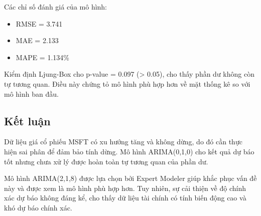 Các chỉ số đánh giá của mô hình:

\begin{itemize}
    \item RMSE = 3.741
    \item MAE = 2.133
    \item MAPE = 1.134\%
\end{itemize}

Kiểm định Ljung-Box cho p-value = 0.097 (> 0.05), cho thấy phần dư không còn tự tương quan. Điều này chứng tỏ mô hình phù hợp hơn về mặt thống kê so với mô hình ban đầu.

\subsection{Kết luận}

Dữ liệu giá cổ phiếu MSFT có xu hướng tăng và không dừng, do đó cần thực hiện sai phân để đảm bảo tính dừng. Mô hình ARIMA(0,1,0) cho kết quả dự báo tốt nhưng chưa xử lý được hoàn toàn tự tương quan của phần dư.

Mô hình ARIMA(2,1,8) được lựa chọn bởi Expert Modeler giúp khắc phục vấn đề này và được xem là mô hình phù hợp hơn. Tuy nhiên, sự cải thiện về độ chính xác dự báo không đáng kể, cho thấy dữ liệu tài chính có tính biến động cao và khó dự báo chính xác.